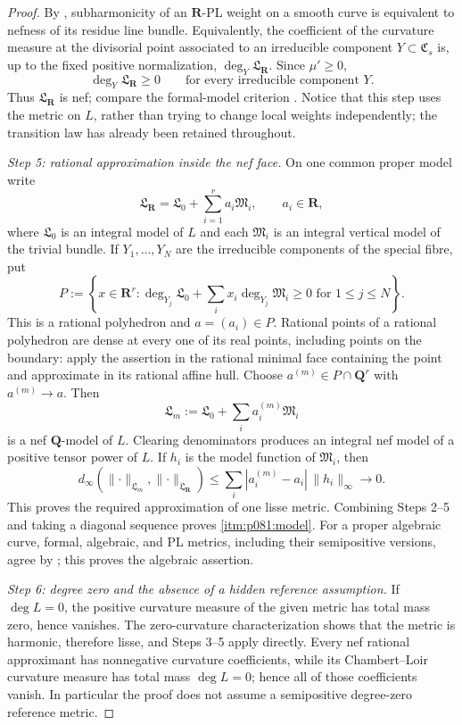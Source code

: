 \begin{proof}
By \cite[Prop.~5.1]{GR25PL}, subharmonicity of an
\(\mathbf R\)-PL weight on a smooth curve is equivalent to nefness of its
residue line bundle. Equivalently, the coefficient of the curvature
measure at the divisorial point associated to an irreducible component
\(Y\subset\mathfrak C_s\) is, up to the fixed positive normalization,
\(\deg_Y\mathfrak L_{\mathbf R}\). Since \(\mu'\geq0\),
\[
                    \deg_Y\mathfrak L_{\mathbf R}\geq0
 \qquad\text{for every irreducible component }Y.
\]
Thus \(\mathfrak L_{\mathbf R}\) is nef; compare the formal-model
criterion \cite[Lem.~7.4]{GJR26}. Notice that this step uses the
metric on \(L\), rather than trying to change local weights independently;
the transition law has already been retained throughout.

\emph{Step 5: rational approximation inside the nef face.}
On one common proper model write
\[
 \mathfrak L_{\mathbf R}
 =\mathfrak L_0+\sum_{i=1}^r a_i\mathfrak M_i,
 \qquad a_i\in\mathbf R,
\]
where \(\mathfrak L_0\) is an integral model of \(L\) and each
\(\mathfrak M_i\) is an integral vertical model of the trivial bundle.
If \(Y_1,\ldots,Y_N\) are the irreducible components of the special fibre,
put
\[
 P:=\left\{x\in\mathbf R^r:
 \deg_{Y_j}\mathfrak L_0+
 \sum_i x_i\deg_{Y_j}\mathfrak M_i\geq0
 \text{ for }1\leq j\leq N\right\}.
\]
This is a rational polyhedron and \(a=(a_i)\in P\). Rational points of a
rational polyhedron are dense at every one of its real points, including
points on the boundary: apply the assertion in the rational minimal face
containing the point and approximate in its rational affine hull. Choose
\(a^{(m)}\in P\cap\mathbf Q^r\) with \(a^{(m)}\to a\). Then
\[
 \mathfrak L_m:=\mathfrak L_0+
                 \sum_i a_i^{(m)}\mathfrak M_i
\]
is a nef \(\mathbf Q\)-model of \(L\). Clearing denominators produces an
integral nef model of a positive tensor power of \(L\). If \(h_i\) is the
model function of \(\mathfrak M_i\), then
\[
 d_\infty(\lVert\cdot\rVert_{\mathfrak L_m},
          \lVert\cdot\rVert_{\mathfrak L_{\mathbf R}})
 \leq\sum_i|a_i^{(m)}-a_i|\,\lVert h_i\rVert_\infty\longrightarrow0.
\]
This proves the required approximation of one lisse metric. Combining
Steps 2--5 and taking a diagonal sequence proves
\cref{itm:p081:model}. For a proper algebraic curve, formal, algebraic, and
PL metrics, including their semipositive versions, agree by
\cite[Thm.~1.1]{GM19}; this proves the algebraic assertion.

\emph{Step 6: degree zero and the absence of a hidden reference
assumption.}
If \(\deg L=0\), the positive curvature measure of the given metric has
total mass zero, hence vanishes. The zero-curvature characterization
\cite[\S3.12]{GR25Classical} shows that the metric is harmonic, therefore lisse,
and Steps 3--5 apply directly. Every nef rational approximant has
nonnegative curvature coefficients, while its Chambert--Loir curvature
measure has total mass \(\deg L=0\); hence all of those coefficients
vanish. In particular the proof does not assume a
semipositive degree-zero reference metric.


\end{proof}
